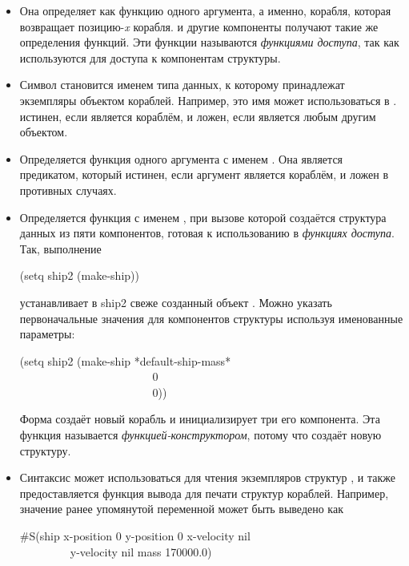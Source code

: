 \begin{itemize}

\item 
Она определяет  как функцию одного аргумента, а именно,
корабля, которая возвращает позицию-\emph{x} корабля.
 и другие компоненты получают такие же определения функций.
Эти функции называются \emph{функциями доступа}, так как используются для
доступа к компонентам структуры.

\item 
Символ  становится именем типа данных, к которому принадлежат
экземпляры объектом кораблей. Например, это имя может использоваться в
.
 истинен, если  является кораблём, и ложен, если
 является любым другим объектом.

\item 
Определяется функция одного аргумента с именем . Она является
предикатом, который истинен, если аргумент является кораблём, и ложен в
противных случаях. 

\item 
Определяется функция с именем , при вызове которой создаётся
структура данных из пяти компонентов, готовая к использованию в \emph{функциях
  доступа}.
Так, выполнение
\begin{lisp}
(setq ship2 (make-ship))
\end{lisp}
устанавливает в ship2 свеже созданный объект .
Можно указать первоначальные значения для компонентов структуры используя
именованные параметры:
\begin{lisp}
(setq ship2 (make-ship  *default-ship-mass* \\
~~~~~~~~~~~~~~~~~~~~~~~ 0 \\
~~~~~~~~~~~~~~~~~~~~~~~ 0))
\end{lisp}
Форма создаёт новый корабль и инициализирует три его компонента.
Эта функция называется \emph{функцией-конструктором}, потому что создаёт новую
структуру.

\item
Синтаксис  может использоваться для чтения экземпляров структур
, и также предоставляется функция вывода для печати структур кораблей.
Например, значение ранее упомянутой переменной  может быть выведено
как
\begin{lisp}
\#S(ship  x-position 0  y-position 0  x-velocity nil \\
~~~~~~~~~y-velocity nil  mass 170000.0)
\end{lisp}


\end{itemize}
